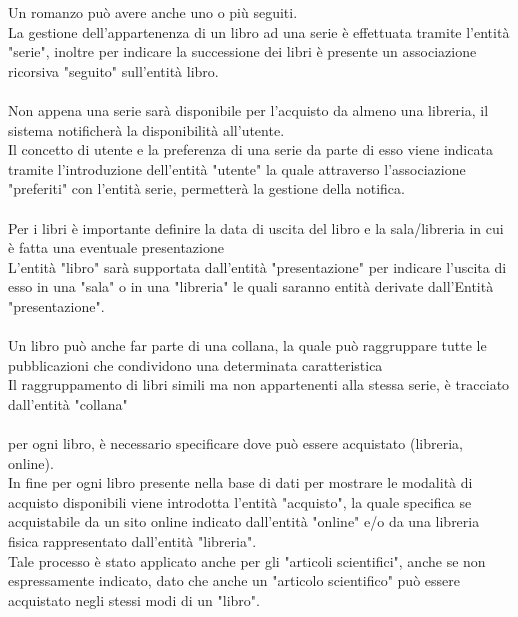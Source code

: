    \large
        \guillemotleft 
            Un romanzo può avere anche uno o più seguiti.
        \guillemotright
    \Large \\ 
    La gestione dell'appartenenza di un libro ad una serie è effettuata tramite l'entità "serie", inoltre per indicare la successione dei libri è presente un associazione ricorsiva "seguito" sull'entità libro.
    \\ \\
    \large
        \guillemotleft 
            Non appena una serie sarà disponibile per l’acquisto da almeno una libreria, il sistema notificherà la disponibilità all’utente.
        \guillemotright
    \Large \\ 
    Il concetto di utente e la preferenza di una serie da parte di esso viene indicata tramite l'introduzione dell'entità "utente" la quale attraverso l'associazione "preferiti" con l'entità serie, permetterà la gestione della  notifica.
    \\\\
     \large
        \guillemotleft 
             Per i libri è importante definire la data di uscita del libro e la sala/libreria in cui è fatta una eventuale presentazione
        \guillemotright
    \Large \\ 
     L'entità "libro" sarà supportata dall'entità "presentazione" per indicare l'uscita di esso in una "sala" o in una "libreria" le quali saranno entità derivate dall'Entità "presentazione".
    \\ \\
     \large
        \guillemotleft 
             Un libro può anche far parte di una collana, la quale può raggruppare tutte le pubblicazioni che condividono una determinata caratteristica 
        \guillemotright
    \Large \\
    Il raggruppamento di libri simili ma non appartenenti alla stessa serie, è tracciato dall'entità "collana"
    \\ \\
    \large
        \guillemotleft 
        per ogni libro, è necessario specificare dove può essere acquistato (libreria, online).
        \guillemotright
    \Large \\  
    In fine per ogni libro presente nella base di dati  per mostrare le modalità di acquisto 
    disponibili viene introdotta l'entità "acquisto", la quale specifica se acquistabile da un sito online
    indicato dall'entità "online" e/o da una libreria fisica rappresentato dall'entità "libreria".\\
    Tale processo è stato applicato anche per gli "articoli scientifici", anche se non espressamente indicato, dato che anche un "articolo scientifico" può essere acquistato negli stessi modi di un "libro".
    \\